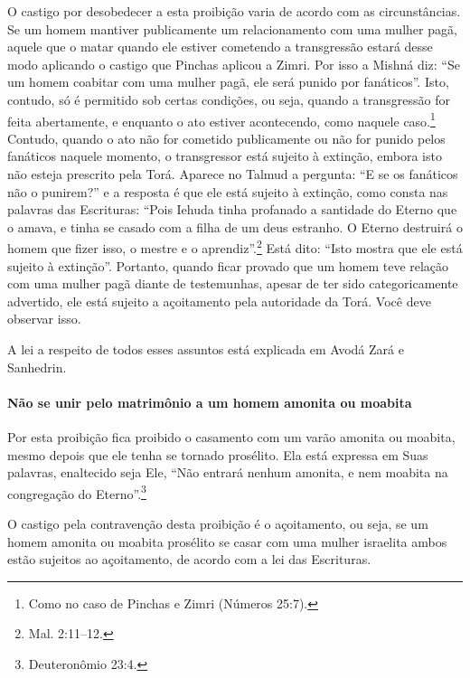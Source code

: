 \begin{multicols}{2}
O castigo por desobedecer a esta proibição varia de acordo com as
circunstâncias. Se um homem mantiver publicamente um relacionamento com
uma mulher pagã, aquele que o matar quando ele estiver cometendo a
transgressão estará desse modo aplicando o castigo que Pinchas\starr{} aplicou a
Zimri\starr. Por isso a Mishná\starr{} diz: ``Se um homem coabitar com uma mulher
pagã, ele será punido por fanáticos''. Isto, contudo, só é permitido
sob certas condições, ou seja, quando a transgressão for feita
abertamente, e enquanto o ato estiver acontecendo, como naquele
caso.\footnote{Como no caso de Pinchas\starr{} e Zimri\starr{} (Números 25:7).} Contudo, quando o ato não for cometido
publicamente ou não for punido pelos fanáticos naquele momento, o
transgressor está sujeito à extinção, embora isto não esteja prescrito
pela Torá\starr. Aparece no Talmud\starr{} a pergunta: ``E se os fanáticos não o
punirem?'' e a resposta é que ele está sujeito à extinção, como consta
nas palavras das Escrituras: ``Pois Iehuda\starr{} tinha profanado a santidade
do Eterno que o amava, e tinha se casado com a filha de um deus
estranho. O Eterno destruirá o homem que fizer isso, o mestre e o
aprendiz''.\footnote{Mal. 2:11--12.} Está dito: ``Isto mostra que ele está
sujeito à extinção''. Portanto, quando ficar provado que um homem teve
relação com uma mulher pagã diante de testemunhas, apesar de ter sido
categoricamente advertido, ele está sujeito a açoitamento pela
autoridade da Torá\starr. Você deve observar isso.

A lei a respeito de todos esses assuntos está explicada em Avodá Zará\starr{} e Sanhedrin\starr.

\paragraph{Não se unir pelo matrimônio a um homem amonita\starr{} ou moabita\starr}

Por esta proibição fica proibido o casamento com um varão amonita\starr{} ou
moabita\starr, mesmo depois que ele tenha se tornado prosélito. Ela está
expressa em Suas palavras, enaltecido seja Ele, ``Não entrará nenhum
amonita\starr, e nem moabita\starr{} na congregação do Eterno''.\footnote{Deuteronômio 23:4.}

O castigo pela contravenção desta proibição é o açoitamento, ou seja,
se um homem amonita\starr{} ou moabita\starr{} prosélito se casar com uma mulher
israelita ambos estão sujeitos ao açoitamento, de acordo com a lei das
Escrituras.


\end{multicols}
